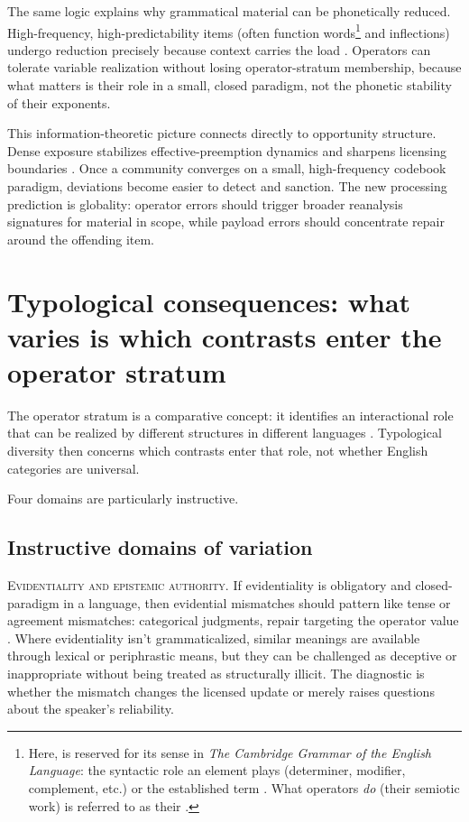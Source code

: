 \documentclass[12pt,letterpaper]{article}
\begin{document}
The same logic explains why grammatical material can be phonetically reduced. High-frequency, high-predictability items (often function words\footnote{Here,  is reserved for its sense in \textit{The Cambridge Grammar of the English Language}: the syntactic role an element plays (determiner, modifier, complement, etc.) or the established term . What operators \emph{do} (their semiotic work) is referred to as their .} and inflections) undergo reduction precisely because context carries the load \citep{jaeger2010}. Operators can tolerate variable realization without losing operator-stratum membership, because what matters is their role in a small, closed paradigm, not the phonetic stability of their exponents.

This information-theoretic picture connects directly to opportunity structure. Dense exposure stabilizes effective-preemption dynamics and sharpens licensing boundaries \citep{bybee2006,bybee2010}. Once a community converges on a small, high-frequency codebook paradigm, deviations become easier to detect and sanction. The new processing prediction is globality: operator errors should trigger broader reanalysis signatures for material in scope, while payload errors should concentrate repair around the offending item.

\section{Typological consequences: what varies is which contrasts enter the operator stratum}

The operator stratum is a comparative concept: it identifies an interactional role that can be realized by different structures in different languages \citep{haspelmath2007}. Typological diversity then concerns which contrasts enter that role, not whether English categories are universal.

Four domains are particularly instructive.

\subsection{Instructive domains of variation}

\textsc{Evidentiality and epistemic authority.} If evidentiality is obligatory and closed-paradigm in a language, then evidential mismatches should pattern like tense or agreement mismatches: categorical judgments, repair targeting the operator value \citep{aikhenvald2004}. Where evidentiality isn't grammaticalized, similar meanings are available through lexical or periphrastic means, but they can be challenged as deceptive or inappropriate without being treated as structurally illicit. The diagnostic is whether the mismatch changes the licensed update or merely raises questions about the speaker's reliability.
\end{document}
